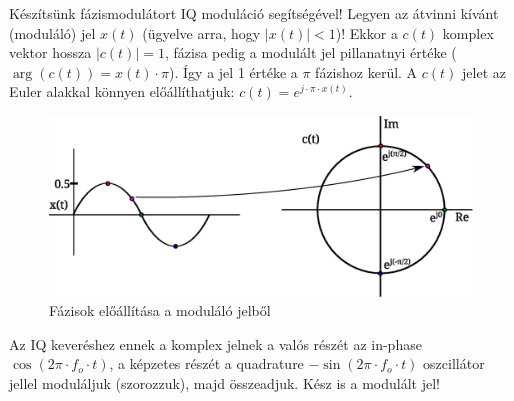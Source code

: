 \documentclass[12pt,a4paper]{article}
\begin{document}
Készítsünk fázismodulátort IQ moduláció segítségével! Legyen az átvinni kívánt (moduláló) jel $x(t)$ (ügyelve arra, hogy $\vert x(t) \vert<1$)! Ekkor a $c(t)$ komplex vektor hossza $\vert c(t) \vert = 1$, fázisa pedig a modulált jel pillanatnyi értéke ($\arg\left(c(t)\right)=x(t) \cdot \pi$). Így a jel 1 értéke a $\pi$ fázishoz kerül. A $c(t)$ jelet az Euler alakkal könnyen előállíthatjuk: $c(t)=e^{j \cdot \pi \cdot x(t)}$.

\begin{figure}[H]
\begin{center}
\includegraphics[width=13cm]{figures/modulaciok_workshop_pm.eps}
\caption{Fázisok előállítása a moduláló jelből}
\label{fig:pm}
\end{center}
\end{figure}

Az IQ keveréshez ennek a komplex jelnek a valós részét az in-phase $\cos(2\pi \cdot f_o \cdot t)$, a képzetes részét a quadrature $-\sin(2\pi \cdot f_o \cdot t)$ oszcillátor jellel moduláljuk (szorozzuk), majd összeadjuk. Kész is a modulált jel!
\end{document}
